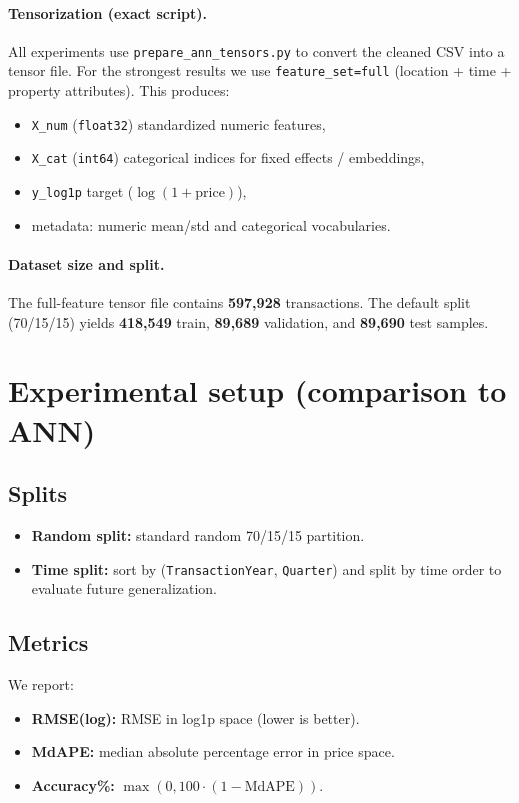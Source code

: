\documentclass[11pt]{article}
\newcommand{\NTotal}{597{,}928}
\newcommand{\NTrain}{418{,}549}
\newcommand{\NVal}{89{,}689}
\newcommand{\NTest}{89{,}690}
\begin{document}
\paragraph{Tensorization (exact script).}
All experiments use \texttt{prepare\_ann\_tensors.py} to convert the cleaned CSV into a tensor file. For the strongest results we use \texttt{feature\_set=full} (location + time + property attributes). This produces:
\begin{itemize}[leftmargin=*]
  \item \texttt{X\_num} (\texttt{float32}) standardized numeric features,
  \item \texttt{X\_cat} (\texttt{int64}) categorical indices for fixed effects / embeddings,
  \item \texttt{y\_log1p} target (\(\log(1+\text{price})\)),
  \item metadata: numeric mean/std and categorical vocabularies.
\end{itemize}

\paragraph{Dataset size and split.}
The full-feature tensor file contains \textbf{\NTotal} transactions. The default split (70/15/15) yields \textbf{\NTrain} train, \textbf{\NVal} validation, and \textbf{\NTest} test samples.

\section{Experimental setup (comparison to ANN)}
\subsection{Splits}
\begin{itemize}[leftmargin=*]
  \item \textbf{Random split:} standard random 70/15/15 partition.
  \item \textbf{Time split:} sort by (\texttt{TransactionYear}, \texttt{Quarter}) and split by time order to evaluate future generalization.
\end{itemize}

\subsection{Metrics}
We report:
\begin{itemize}[leftmargin=*]
  \item \textbf{RMSE(log):} RMSE in log1p space (lower is better).
  \item \textbf{MdAPE:} median absolute percentage error in price space.
  \item \textbf{Accuracy\%:} \(\max(0,100\cdot(1-\text{MdAPE}))\).
\end{itemize}
\end{document}
